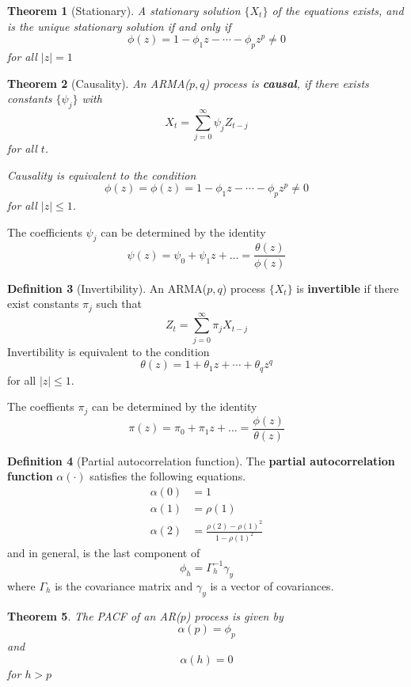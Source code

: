 \documentclass[10pt, oneside, reqno]{amsart}
\theoremstyle{plain}%
\newtheorem{thm}{Theorem}[section]
\theoremstyle{definition}
\newtheorem{defn}[thm]{Definition}
\theoremstyle{remark}
\newcommand{\ts}[1]{\{ #1 \}}
\begin{document}
\begin{thm}[Stationary]
    A stationary solution $\ts{X_t}$ of the equations exists, and is the unique stationary solution if and only if \[
        \phi(z) = 1 - \phi_1 z - \cdots - \phi_p z^p \neq 0
    \] for all $|z| = 1$
\end{thm}

\begin{thm}[Causality]
    An ARMA($p,q$) process is \textbf{causal}, if there exists constants $\ts{\psi_j}$ with \[
        X_t = \sum_{j=0}^\infty \psi_j Z_{t-j}
    \] for all $t$.
    
    Causality is equivalent to the condition \[
        \phi(z) = \phi(z) = 1 - \phi_1 z - \cdots - \phi_p z^p \neq 0
    \] for all $|z| \leq 1$.
\end{thm}

The coefficients $\psi_j$ can be determined by the identity \[
    \psi(z) = \psi_0 + \psi_1 z + \dots = \frac{\theta(z)}{\phi(z)}
    \]


\begin{defn}[Invertibility]
    An ARMA($p,q$) process $\ts{X_t}$ is \textbf{invertible} if there exist constants $\pi_j$ such that \[
        Z_t = \sum_{j=0}^\infty \pi_j X_{t-j}
    \]
    Invertibility is equivalent to the condition \[
        \theta(z) = 1 + \theta_1 z + \cdots + \theta_q z^q
    \] for all $|z| \leq 1$.
\end{defn}

The coeffients $\pi_j$ can be determined by the identity \[
    \pi(z) = \pi_0 + \pi_1 z + \dots = \frac{\phi(z)}{\theta(z)}
    \]


\begin{defn}[Partial autocorrelation function]
    The \textbf{partial autocorrelation function} $\alpha(\cdot)$ satisfies the following equations.
    \begin{align*}
        \alpha(0) &= 1\\
        \alpha(1) &= \rho(1) \\
        \alpha(2) &= \frac{\rho(2) - \rho(1)^2}{1 - \rho(1)^2}
    \end{align*}
    and in general, is the last component of \[
        \phi_h  =\Gamma_h^{-1} \gamma_y
    \] where $\Gamma_h$ is the covariance matrix and $\gamma_y$ is a vector of covariances. 
\end{defn}

\begin{thm}
    The PACF of an AR($p$) process is given by \[
        \alpha(p) = \phi_p
    \]
    and \[
        \alpha(h) = 0
    \] for $h > p$
\end{thm}
\end{document}
